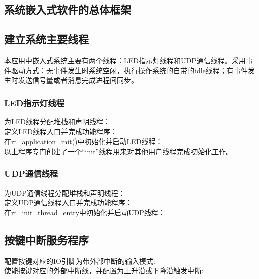 \subsection{系统嵌入式软件的总体框架}

\subsection{建立系统主要线程}
本应用中嵌入式系统主要有两个线程：LED指示灯线程和UDP通信线程。采用事件驱动方式：无事件发生时系统空闲，执行操作系统的自带的idle线程；有事件发生时发送信号量或者消息完成进程间同步。

\subsubsection{LED指示灯线程}
为LED线程分配堆栈和声明线程：\\


定义LED线程入口并完成功能程序：\\


在rt{\_}application{\_}init()中初始化并启动LED线程：\\

以上程序专门创建了一个“init”线程用来对其他用户线程完成初始化工作。

\subsubsection{UDP通信线程}
为UDP通信线程分配堆栈和声明线程：\\


定义UDP通信线程入口并完成功能程序：\\


在rt{\_}init{\_}thread{\_}entry{}中初始化并启动UDP线程：\\


\subsection{按键中断服务程序}
配置按键对应的IO引脚为带外部中断的输入模式:\\


使能按键对应的外部中断线，并配置为上升沿或下降沿触发中断:\\


